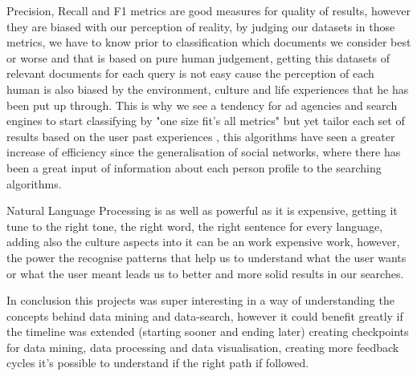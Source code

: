 \documentclass{acm_proc_article-sp}
\begin{document}
Precision, Recall and F1 metrics are good measures for quality of results, however they are biased with our perception of reality, by judging our datasets in those metrics, we have to know prior to classification which documents we consider best or worse and that is based on pure human judgement, getting this datasets of relevant documents for each query is not easy cause the perception of each human is also biased by the environment, culture and life experiences that he has been put up through. This is why we see a tendency for ad agencies and search engines to start classifying by "one size fit's all metrics" but yet tailor each set of results based on the user past experiences , this algorithms have seen a greater increase of efficiency since the generalisation of social networks, where there has been a great input of information about each person profile to the searching algorithms.

Natural Language Processing is as well as powerful as it is expensive, getting it tune to the right tone, the right word, the right sentence for every language, adding also the culture aspects into it can be an work expensive work, however, the power the recognise patterns that help us to understand what the user wants or what the user meant leads us to better and more solid results in our searches.

In conclusion this projects was super interesting in a way of understanding the concepts behind data mining and data-search, however it could benefit greatly if the timeline was extended (starting sooner and ending later) creating checkpoints for data mining, data processing and data visualisation, creating more feedback cycles it's possible to understand if the right path if followed.



\end{document}
